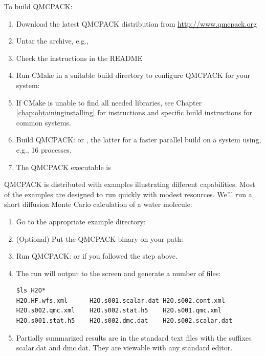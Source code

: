 To build QMCPACK:

\begin{enumerate}
\item Download the latest QMCPACK distribution from
  \url{http://www.qmcpack.org}
\item Untar the archive, e.g., 
\item Check the instructions in the README
\item Run CMake in a suitable build directory to configure QMCPACK for
  your system: 
\item If CMake is unable to find all needed libraries, see Chapter
  \ref{chap:obtaininginstalling} for instructions and specific build
  instructions for common systems.
\item Build QMCPACK:  or , the latter
  for a faster parallel build on a system using, e.g., 16 processes.
\item The QMCPACK executable is 
\end{enumerate}

QMCPACK is distributed with examples illustrating different
capabilities. Most of the examples are designed to run quickly with
modest resources. We'll run a short diffusion Monte Carlo calculation
of a water molecule:

\begin{enumerate}
\item Go to the appropriate example directory: 
\item (Optional) Put the QMCPACK binary on your path:\\ 
\item Run QMCPACK:  or
   if you followed the step above.
\item The run will output to the screen and generate a number of files:
\begin{verbatim}
$ls H2O*
H2O.HF.wfs.xml      H2O.s001.scalar.dat H2O.s002.cont.xml
H2O.s002.qmc.xml    H2O.s002.stat.h5    H2O.s001.qmc.xml
H2O.s001.stat.h5    H2O.s002.dmc.dat    H2O.s002.scalar.dat
\end{verbatim}
\item Partially summarized results are in the standard text files with the
  suffixes scalar.dat and dmc.dat. They are viewable with any standard editor.
\end{enumerate}

